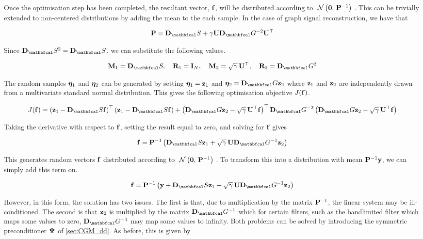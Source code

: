 Once the optimisation step has been completed, the resultant vector, $\mathbf{f}$, will be distributed according to $\; \mathcal{N}\left(\mathbf{0}, \, \mathbf{P}^{-1}\right) \;$. This can be trivially extended to non-centered distributions by adding the mean to the each sample. In the case of graph signal reconstruction, we have that 

$$
\PP = \D_\St + \gamma \U \D_\Gt^{-2} \U^\top
$$

Since $\D_\St^2 = \D_\St$, we can substitute the following values. 

$$
\M_1 = \D_\St, \quad  \RR_1 = \I_N, \quad \M_2 = \sqrt{\gamma} \, \U^\top, \quad  \RR_2 = \D_\Gt^2
$$

The random samples $\boldsymbol{\eta}_1$ and $\boldsymbol{\eta}_2$ can be generated by setting $\boldsymbol{\eta}_1 = \mathbf{z}_1$ and $\etaa_2 = \D_\Gt \z_2$ where $\mathbf{z}_1$ and $\mathbf{z}_2$ are independently drawn from a multivariate standard normal distribution. This gives the following optimisation objective $J(\mathbf{f})$.

\begin{equation}
    J(\f) = \left(\z_1 - \D_\St \f\right)^\top\left(\z_1 - \D_\St \f\right) + \left(\D_\Gt \z_2 - \sqrt{\gamma} \, \U^\top  \f\right)^\top \D_\Gt^{-2} \left(\D_\Gt \z_2 - \sqrt{\gamma} \, \U^\top  \f\right)
\end{equation}

Taking the derivative with respect to $\mathbf{f}$, setting the result equal to zero, and solving for $\mathbf{f}$ gives

\begin{equation}
    \f = \PP^{-1} \left(\D_\St \z_1 + \sqrt{\gamma} \, \U \D_\Gt^{-1} \z_2 \right)
\end{equation}

This generates random vectors $\mathbf{f}$ distributed according to $\; \mathcal{N}\left(\mathbf{0}, \, \mathbf{P}^{-1}\right) \;$. To transform this into a distribution with mean $\mathbf{P}^{-1} \mathbf{y}$, we can simply add this term on. 

\begin{equation}
    \f = \PP^{-1} \left(\y + \D_\St \z_1 + \sqrt{\gamma} \, \U \D_\Gt^{-1} \z_2 \right)
\end{equation}

However, in this form, the solution has two issues. The first is that, due to multiplication by the matrix $\mathbf{P}^{-1}$, the linear system may be ill-conditioned. The second is that $\mathbf{z}_2$ is multiplied by the matrix $\D_\Gt^{-1}$ which for certain filters, such as the bandlimited filter which maps some values to zero, $\D_\Gt^{-1}$ may map some values to infinity. Both problems can be solved by introducing the symmetric preconditioner $\mathbf{\Psi}$ of \cref{sec:CGM_dd}. As before, this is given by 


